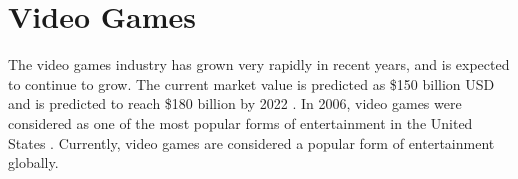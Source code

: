 \documentclass[a4paper,11.5pt]{report}
\numberwithin{figure}{section}
\numberwithin{table}{section}
\numberwithin{equation}{section}
\numberwithin{equation}{section}
\begin{document}




\section{Video Games}




The video games industry has grown very rapidly in recent years, and is expected to continue to grow. The current market value is predicted as \$150 billion USD and is predicted to reach \$180 billion by 2022 \citep{vgamesResearch}. In 2006, video games were considered as one of the most popular forms of entertainment in the United States \citep{sherry2006, ritterfeld2006}. Currently, video games are considered a popular form of entertainment globally.

\end{document}
